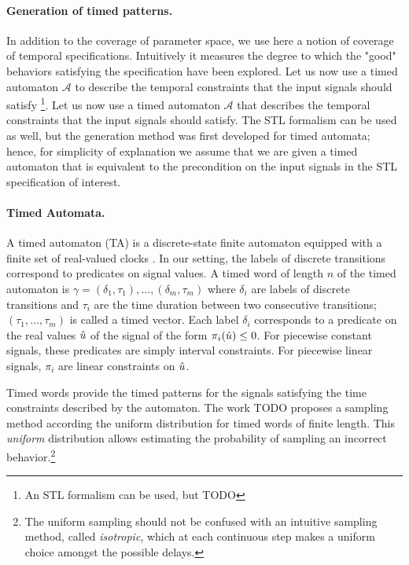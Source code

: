 \paragraph{Generation of timed patterns.} 
In addition to the coverage of parameter space, we use here a notion of coverage of temporal specifications. Intuitively it measures the degree to which the "good" behaviors satisfying the specification have been explored. Let us now use a timed automaton $\mathcal{A}$ to describe the temporal constraints that the input signals should satisfy \footnote{An STL formalism can be used, but {\color{red}TODO}}.  Let us now use a timed automaton $\mathcal{A}$ that describes the temporal constraints that the input signals should satisfy. The STL formalism can be used as well, but the generation method  was first developed for timed automata; hence, for simplicity of explanation we assume that we are given a timed automaton that is equivalent to the precondition on the input signals in the STL specification of interest. 

\paragraph{Timed Automata.} A timed automaton (TA) is a discrete-state finite automaton equipped with a finite set of real-valued clocks \cite{Alur94}. 
In our setting, the labels of discrete transitions correspond to predicates on signal values.
A timed word of length $n$ of the timed automaton is $\gamma = (\delta_1, \tau_1), \ldots, (\delta_m, \tau_m)$ where $\delta_i$ are labels of discrete transitions and $\tau_i$ are the time duration between two consecutive transitions; $(\tau_1, \ldots, \tau_m)$ is called a timed vector. Each label $\delta_i$ corresponds to a predicate on the real values $\hat{u}$ of the signal of the form $\pi_i(\hat{u}) \le 0$. For piecewise constant signals, these predicates are simply interval constraints. For piecewise linear signals, $\pi_i$ are linear constraints on $\hat{u}$. 

Timed words provide the timed patterns for the signals satisfying the time constraints described by the automaton. The work \cite{BBBK16} {\color{red}TODO} proposes a sampling method according the uniform distribution for timed words of finite length. This \emph{uniform} distribution allows estimating the probability of sampling an incorrect behavior.\footnote{The uniform sampling should not be confused with an intuitive sampling method, called \emph{isotropic}, which at each continuous step makes a uniform choice amongst the possible delays.}

